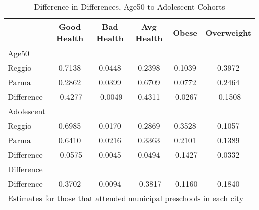 \begin{table}[htbp]\centering
\caption{Difference in Differences, Age50 to Adolescent Cohorts}
\begin{tabular}{l*{5}{c}}
\hline\hline
            & Good Health&  Bad Health&  Avg Health&       Obese&  Overweight\\
\hline
Age50       &            &            &            &            &            \\
Reggio      &      0.7138&      0.0448&      0.2398&      0.1039&      0.3972\\
Parma       &      0.2862&      0.0399&      0.6709&      0.0772&      0.2464\\
Difference  &     -0.4277&     -0.0049&      0.4311&     -0.0267&     -0.1508\\
\hline
Adolescent  &            &            &            &            &            \\
Reggio      &      0.6985&      0.0170&      0.2869&      0.3528&      0.1057\\
Parma       &      0.6410&      0.0216&      0.3363&      0.2101&      0.1389\\
Difference  &     -0.0575&      0.0045&      0.0494&     -0.1427&      0.0332\\
\hline
Difference  &            &            &            &            &            \\
Difference  &      0.3702&      0.0094&     -0.3817&     -0.1160&      0.1840\\
\hline\hline
\multicolumn{6}{l}{\footnotesize Estimates for those that attended municipal preschools in each city}\\
\end{tabular}
\end{table}
